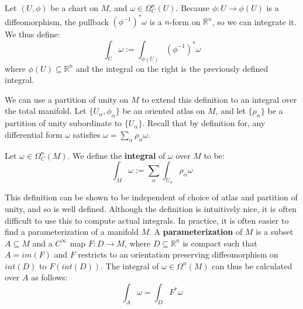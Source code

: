 Let $(U, \phi)$ be a chart on $M$, and $\omega\in\Omega^n_C(U)$. Because $\phi : U\rightarrow\phi(U)$ is a 
diffeomorphism, the pullback $(\phi^{-1})^*\omega$ is a $n$-form on $\mathbb R^n$, so we can integrate it. We thus define:
\begin{equation}
	\int_U\omega := \int_{\phi(U)}\left(\phi^{-1}\right)^*\omega
\end{equation}
where $\phi(U)\subseteq\mathbb R^n$ and the integral on the right is the previously defined integral. 

We can use a partition of unity on $M$ to extend this definition to an integral over the total manifold. Let $\{U_\alpha, 
\phi_\alpha\}$ be an oriented atlas on $M$, and let $\{\rho_\alpha\}$ be a partition of unity subordinate to $\{U_\alpha\}$. 
Recall that by definition for, any differential form $\omega$ satisfies $\omega = \sum_\alpha\rho_\alpha\omega$. 
\begin{definition}
Let $\omega\in\Omega^n_C(M)$. We define the \textbf{integral} of $\omega$ over $M$ to be:
\begin{equation}
	\int_M\omega := \sum_\alpha\int_{U_{\alpha}}\rho_\alpha\omega
\end{equation}
\end{definition}

This definition can be shown to be independent of choice of atlas and partition of unity, and so is well defined. Although 
the definition is intuitively nice, it is often difficult to use this to compute actual integrals. In practice, it is often 
easier to find a parameterization of a manifold $M$. A \textbf{parameterization} of $M$ is a subset $A\subseteq M$ and a 
$C^\infty$ map $F : D\rightarrow M$, where $D\subseteq\mathbb R^n$ is compact such that $A = im(F)$ and $F$ 
restricts to an orientation preserving diffeomorphism on $int(D)$ to $F(int(D))$. The integral of $\omega\in\Omega^n(M)$ 
can thus be calculated over $A$ as follows:
\begin{equation}
	\int_A\omega = \int_D F^*\omega
\end{equation}

